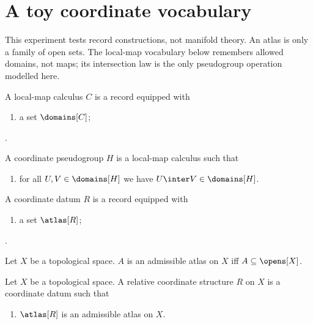 

\section{A toy coordinate vocabulary}

This experiment tests record constructions, not manifold theory. An atlas is
only a family of open sets. The local-map vocabulary below remembers allowed
domains, not maps; its intersection law is the only pseudogroup operation
modelled here.

\begin{struct}\label{local_map_calculus}
    A local-map calculus $C$ is a record equipped with
    \begin{enumerate}
        \item a set $\domains[C]$;
    \end{enumerate}.
\end{struct}

\begin{struct}\label{coordinate_pseudogroup}
    A coordinate pseudogroup $H$ is a local-map calculus such that
    \begin{enumerate}
        \item\label{domains_inter}
            for all $U,V\in\domains[H]$ we have $U\inter V\in\domains[H]$.
    \end{enumerate}
\end{struct}

\begin{struct}\label{coordinate_datum}
    A coordinate datum $R$ is a record equipped with
    \begin{enumerate}
        \item a set $\atlas[R]$;
    \end{enumerate}.
\end{struct}

\begin{definition}\label{admissible_atlas}
    Let $X$ be a topological space.
    $A$ is an admissible atlas on $X$ iff $A\subseteq\opens[X]$.
\end{definition}

\begin{struct}\label{relative_coordinate_structure}
    Let $X$ be a topological space.
    A relative coordinate structure $R$ on $X$ is a coordinate datum such that
    \begin{enumerate}
        \item\label{relative_atlas_admissible}
            $\atlas[R]$ is an admissible atlas on $X$.
    \end{enumerate}
\end{struct}

